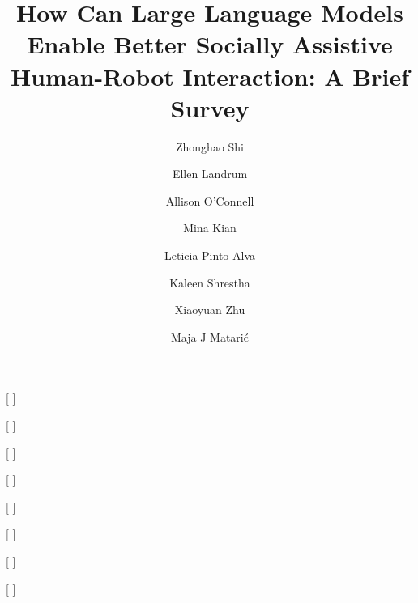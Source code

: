 \documentclass[
twocolumn,
]{ceurart}
\begin{document}


\title{How Can Large Language Models Enable Better Socially Assistive Human-Robot Interaction: A Brief Survey}

\tnotemark[1]

\author[1]{Zhonghao Shi}[%
]
\cormark[1]
\address[1]{University of Southern California, Los Angeles, United States}


\author[1]{Ellen Landrum}[%
]

\author[1]{Allison O'Connell}[%
]

\author[1]{Mina Kian}[%
]

\author[1]{Leticia Pinto-Alva}[%
]





\author[1]{Kaleen Shrestha}[%
]

\author[1]{Xiaoyuan Zhu}[%
]





\author[1]{Maja J Matari\'c}[%
]
\end{document}
